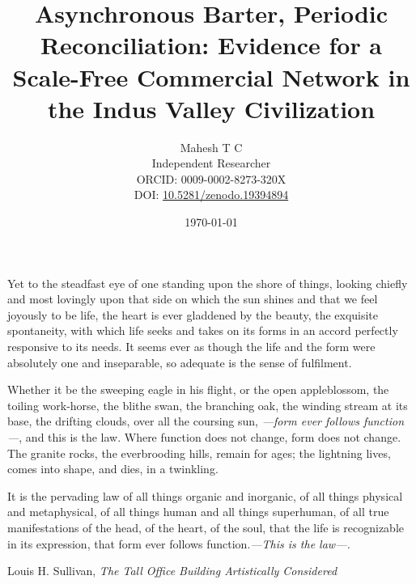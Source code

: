 \documentclass[12pt]{article}
\title{Asynchronous Barter, Periodic Reconciliation: Evidence for a \\
Scale-Free Commercial Network in the Indus Valley Civilization}
\author{
  Mahesh T C \\
  Independent Researcher \\
  ORCID: 0009-0002-8273-320X \\
  DOI: \href{https://doi.org/10.5281/zenodo.19394894}{10.5281/zenodo.19394894}
}
\date{\today}
\begin{document}
\maketitle

\epigraph{Yet to the steadfast eye of one standing upon the shore of things, looking
chiefly and most lovingly upon that side on which the sun shines and that we feel
joyously to be life, the heart is ever gladdened by the beauty, the exquisite
spontaneity, with which life seeks and takes on its forms in an accord perfectly
responsive to its needs. It seems ever as though the life and the form were absolutely
one and inseparable, so adequate is the sense of fulfilment.

Whether it be the sweeping eagle in his flight, or the open appleblossom, the
toiling work-horse, the blithe swan, the branching oak, the winding stream at its
base, the drifting clouds, over all the coursing sun, \textit{---form ever follows function---},
and this is the law. Where function does not change, form does not change. The
granite rocks, the everbrooding hills, remain for ages; the lightning lives, comes
into shape, and dies, in a twinkling.

It is the pervading law of all things organic and inorganic, of all things physical
and metaphysical, of all things human and all things superhuman, of all true
manifestations of the head, of the heart, of the soul, that the life is recognizable
in its expression, that form ever follows function.\textit{---This is the law---.}}
{Louis H. Sullivan, \textit{The Tall Office Building Artistically Considered}}
\end{document}
